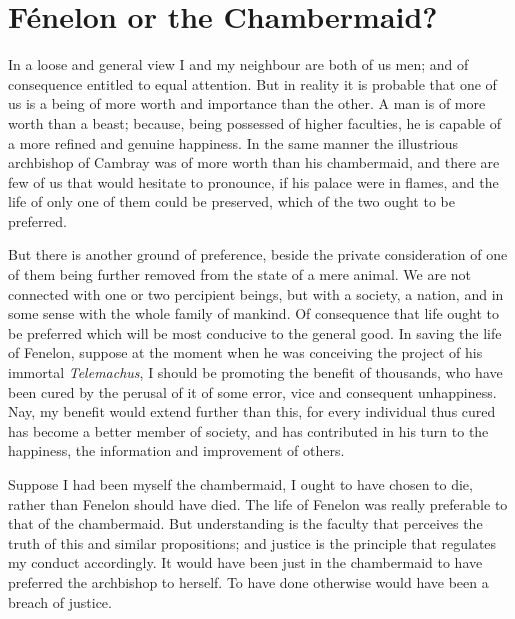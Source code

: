 
\author{William Godwin}
\chapter{F\'enelon or the Chambermaid?}

In a loose and general view I and my neighbour are both of us
men; and of consequence entitled to equal attention. But in reality it
is probable that one of us is a being of more worth and importance
than the other. A man is of more worth than a beast; because, being
possessed of higher faculties, he is capable of a more refined and
genuine happiness. In the same manner  the illustrious
archbishop of Cambray was of more worth than his chambermaid, and
there are few of us that would hesitate to pronounce, if his palace
were in flames, and the life of only one of them could be preserved,
which of the two ought to be preferred.

But there is another ground of preference, beside the private
consideration of one of them being further removed from the state of a
mere animal. We are not connected with one or two percipient beings,
but with a society, a nation, and in some sense with the whole family
of mankind. Of consequence that life ought to be preferred which will
be most conducive to the general good. In saving the life of Fenelon,
suppose at the moment when he was conceiving the project of his
immortal \textit{Telemachus}, I should be promoting the benefit of
thousands, who have been cured by the perusal of it of some error,
vice and consequent unhappiness. Nay, my benefit would extend further
than this, for every individual thus cured has become a better member
of society, and has contributed in his turn to the happiness, the
information and improvement of others.

Suppose I had been myself the chambermaid, I ought to have chosen to
die, rather than Fenelon should have died. The life of Fenelon was
really preferable to that of the chambermaid. But understanding is the
faculty that perceives the truth of this and similar propositions; and
justice is the principle that  regulates my conduct
accordingly. It would have been just in the chambermaid to have
preferred the archbishop to herself. To have done otherwise would have
been a breach of justice.

